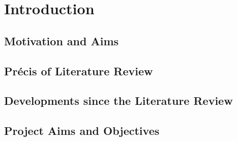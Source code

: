 \chapter{Introduction}
\section{Motivation and Aims}

\section{Précis of Literature Review}

\section{Developments since the Literature Review}

\section{Project Aims and Objectives}
